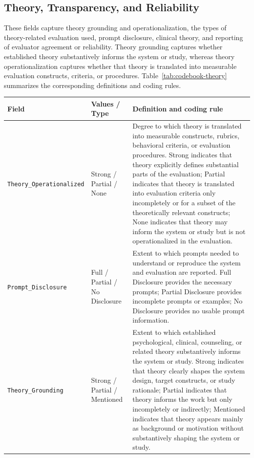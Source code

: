 \subsection{Theory, Transparency, and Reliability}

These fields capture theory grounding and operationalization, the types of theory-related evaluation used, prompt disclosure, clinical theory, and reporting of evaluator agreement or reliability. 
Theory grounding captures whether established theory substantively informs the system or study, whereas theory operationalization captures whether that theory is translated into measurable evaluation constructs, criteria, or procedures. 
Table~\ref{tab:codebook-theory} summarizes the corresponding definitions and coding rules.

\begin{table}[p]
\centering
\begin{tabular}{p{4.3cm}p{2.5cm}p{8.0cm}}
\toprule
\textbf{Field} & \textbf{Values / Type} & \textbf{Definition and coding rule} \\
\midrule

\texttt{Theory\_Operationalized}
&
Strong / Partial / None
&
Degree to which theory is translated into measurable constructs, rubrics, behavioral criteria, or evaluation procedures.
Strong indicates that theory explicitly defines substantial parts of the evaluation; Partial indicates that theory is translated into evaluation criteria only incompletely or for a subset of the theoretically relevant constructs; None indicates that theory may inform the system or study but is not operationalized in the evaluation.
\\
\midrule

\texttt{Prompt\_Disclosure}
&
Full / Partial / No Disclosure
&
Extent to which prompts needed to understand or reproduce the system and evaluation are reported.
Full Disclosure provides the necessary prompts; Partial Disclosure provides incomplete prompts or examples; No Disclosure provides no usable prompt information.
\\
\midrule

\texttt{Theory\_Grounding}
&
Strong / Partial / Mentioned
&
Extent to which established psychological, clinical, counseling, or related theory substantively informs the system or study.
Strong indicates that theory clearly shapes the system design, target constructs, or study rationale; Partial indicates that theory informs the work but only incompletely or indirectly; Mentioned indicates that theory appears mainly as background or motivation without substantively shaping the system or study.
\\
\midrule


\end{tabular}
\end{table}
